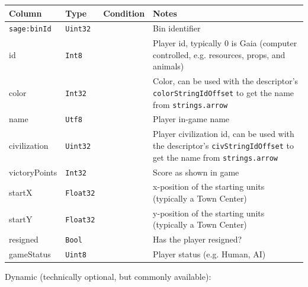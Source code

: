 \begin{longtable}{@{}p{}p{}p{}p{}@{}}
  \toprule
  Column & Type & Condition & Notes \\
  \midrule
  \endhead
  \texttt{sage:binId} & \texttt{Uint32} & & Bin identifier \\
  id & \texttt{Int8} & & Player id, typically 0 is Gaia (computer controlled, e.g. resources, props, and animals) \\
  color & \texttt{Int32} & & Color, can be used with the descriptor's \texttt{colorStringIdOffset} to get the name from \texttt{strings.arrow} \\
  name & \texttt{Utf8} & & Player in-game name \\
  civilization & \texttt{Uint32} & & Player civilization id, can be used with the descriptor's \texttt{civStringIdOffset} to get the name from \texttt{strings.arrow} \\
  victoryPoints & \texttt{Int32} & & Score as shown in game \\
  startX & \texttt{Float32} & & x-position of the starting units (typically a Town Center) \\
  startY & \texttt{Float32} & & y-position of the starting units (typically a Town Center) \\
  resigned & \texttt{Bool} & & Has the player resigned? \\
  gameStatus & \texttt{Uint8} & & Player status (e.g. Human, AI) \\
  \bottomrule
\end{longtable}

Dynamic (technically optional, but commonly available):

